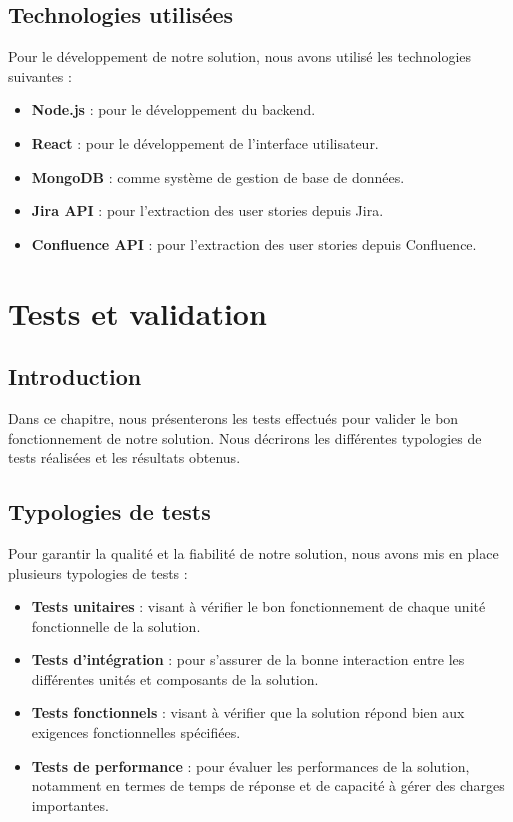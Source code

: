 \documentclass[12pt,a4paper]{report}
\begin{document}
\section{Technologies utilisées}
Pour le développement de notre solution, nous avons utilisé les technologies suivantes :
\begin{itemize}
    \item \textbf{Node.js} : pour le développement du backend.
    \item \textbf{React} : pour le développement de l'interface utilisateur.
    \item \textbf{MongoDB} : comme système de gestion de base de données.
    \item \textbf{Jira API} : pour l'extraction des user stories depuis Jira.
    \item \textbf{Confluence API} : pour l'extraction des user stories depuis Confluence.
\end{itemize}

\chapter{Tests et validation}
\section{Introduction}
Dans ce chapitre, nous présenterons les tests effectués pour valider le bon fonctionnement de notre solution. Nous décrirons les différentes typologies de tests réalisées et les résultats obtenus.

\section{Typologies de tests}
Pour garantir la qualité et la fiabilité de notre solution, nous avons mis en place plusieurs typologies de tests :
\begin{itemize}
    \item \textbf{Tests unitaires} : visant à vérifier le bon fonctionnement de chaque unité fonctionnelle de la solution.
    \item \textbf{Tests d'intégration} : pour s'assurer de la bonne interaction entre les différentes unités et composants de la solution.
    \item \textbf{Tests fonctionnels} : visant à vérifier que la solution répond bien aux exigences fonctionnelles spécifiées.
    \item \textbf{Tests de performance} : pour évaluer les performances de la solution, notamment en termes de temps de réponse et de capacité à gérer des charges importantes.
\end{itemize}
\end{document}
